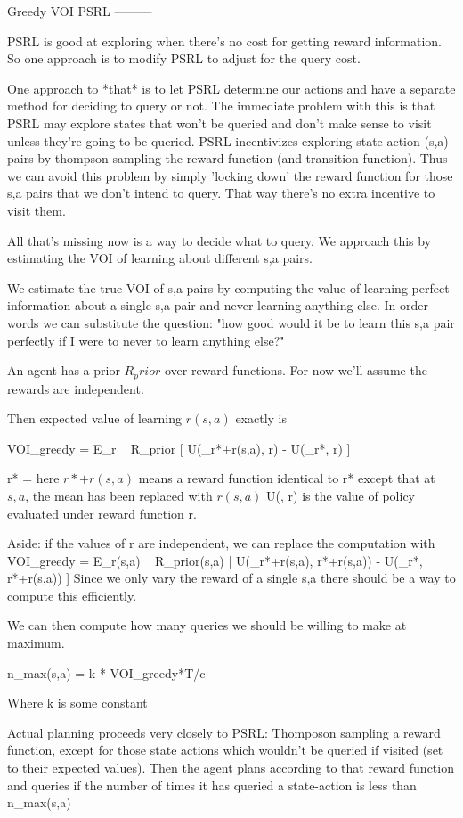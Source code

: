 Greedy VOI PSRL
---------

PSRL is good at exploring when there's no cost for getting reward information. So one approach is to modify PSRL to adjust for the query cost. 

One approach to *that* is to let PSRL determine our actions and have a separate method for deciding to query or not. The immediate problem with this is that PSRL may explore states that won't be queried and don't make sense to visit unless they're going to be queried. PSRL incentivizes exploring state-action (s,a) pairs by thompson sampling the reward function (and transition function). Thus we can avoid this problem by simply 'locking down' the reward function for those s,a pairs that we don't intend to query. That way there's no extra incentive to visit them.

All that's missing now is a way to decide what to query. We approach this by estimating the VOI of learning about different s,a pairs. 

We estimate the true VOI of s,a pairs by computing the value of learning perfect information about a single s,a pair and never learning anything else. 
In order words we can substitute the question: "how good would it be to learn this s,a pair perfectly if I were to never to learn anything else?"

An agent has a prior $R_prior$ over reward functions. For now we'll assume the rewards are independent. 

Then expected value of learning $r(s,a)$ exactly is

VOI_greedy = E_{r ~ R_prior}  [ 
  U(\pi_r*+r(s,a), r) - 
  U(\pi_r*,  r) 
  ]

r* = \mean[r]
here $ r* + r(s,a) $ means a reward function identical to r* except that at $s,a$, the mean has been replaced with $r(s,a)$
U(\pi, r) is the value of policy \pi evaluated under reward function r.
 
Aside: if the values of r are independent, we can replace the computation with
  VOI_greedy = E_{r(s,a) ~ R_prior(s,a)}  [ 
    U(\pi_r*+r(s,a), r*+r(s,a)) - 
    U(\pi_r*,  r*+r(s,a)) 
    ]
  Since we only vary the reward of a single s,a there should be a way to compute this efficiently.

We can then compute how many queries we should be willing to make at maximum.

n_max(s,a) = k * VOI_greedy*T/c 

Where k is some constant 

Actual planning proceeds very closely to PSRL: Thomposon sampling a reward function, except for those state actions which wouldn't be queried if visited (set to their expected values). 
Then the agent plans according to that reward function and queries if the number of times it has queried a state-action is less than n_max(s,a)

